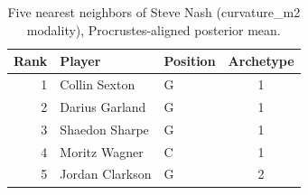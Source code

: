 \begin{table}[htbp]
  \centering\small
  \begin{tabular}{rllc}
    \toprule
    Rank & Player & Position & Archetype \\
    \midrule
    1 & Collin Sexton & G & 1 \\
    2 & Darius Garland & G & 1 \\
    3 & Shaedon Sharpe & G & 1 \\
    4 & Moritz Wagner & C & 1 \\
    5 & Jordan Clarkson & G & 2 \\
    \bottomrule
  \end{tabular}
  \caption{Five nearest neighbors of Steve Nash (curvature_m2 modality), Procrustes-aligned posterior mean.}
  \label{tab:Steve_Nash_neighbors_curvature_m2}
\end{table}

